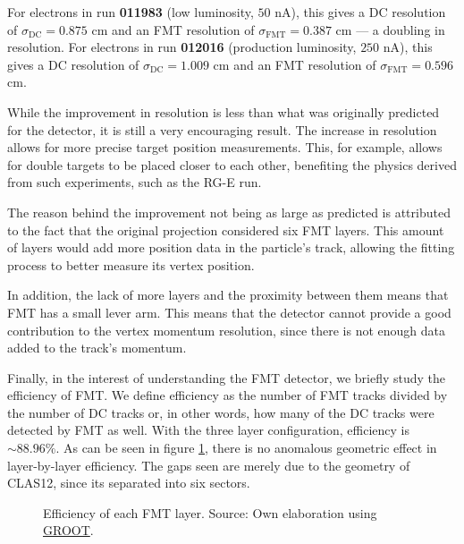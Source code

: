     For electrons in run \textbf{011983} (low luminosity, $50$ nA), this gives a DC resolution of $\sigma_\text{DC} = 0.875$ cm and an FMT resolution of $\sigma_\text{FMT} = 0.387$ cm --- a doubling in resolution.
    For electrons in run \textbf{012016} (production luminosity, $250$ nA), this gives a DC resolution of $\sigma_\text{DC} = 1.009$ cm and an FMT resolution of $\sigma_\text{FMT} = 0.596$ cm.


    While the improvement in resolution is less than what was originally predicted for the detector, it is still a very encouraging result.
    The increase in resolution allows for more precise target position measurements.
    This, for example, allows for double targets to be placed closer to each other, benefiting the physics derived from such experiments, such as the RG-E run. %

    The reason behind the improvement not being as large as predicted is attributed to the fact that the original projection considered six FMT layers.
    This amount of layers would add more position data in the particle's track, allowing the fitting process to better measure its vertex position.

    In addition, the lack of more layers and the proximity between them means that FMT has a small lever arm.
    This means that the detector cannot provide a good contribution to the vertex momentum resolution, since there is not enough data added to the track's momentum. %

    Finally, in the interest of understanding the FMT detector, we briefly study the efficiency of FMT.
    We define efficiency as the number of FMT tracks divided by the number of DC tracks or, in other words, how many of the DC tracks were detected by FMT as well.
    With the three layer configuration, efficiency is $\sim 88.96\%$.
    As can be seen in figure \ref{fig::fmt_efficiency}, there is no anomalous geometric effect in layer-by-layer efficiency.
    The gaps seen are merely due to the geometry of CLAS12, since its separated into six sectors.

    \begin{figure}[b]
        \centering{}
        \caption[FMT layers efficiency]{Efficiency of each FMT layer.
        Source: Own elaboration using \hyperlink{https://github.com/gavalian/groot}{GROOT}.}
        \label{fig::fmt_efficiency}
    \end{figure}

